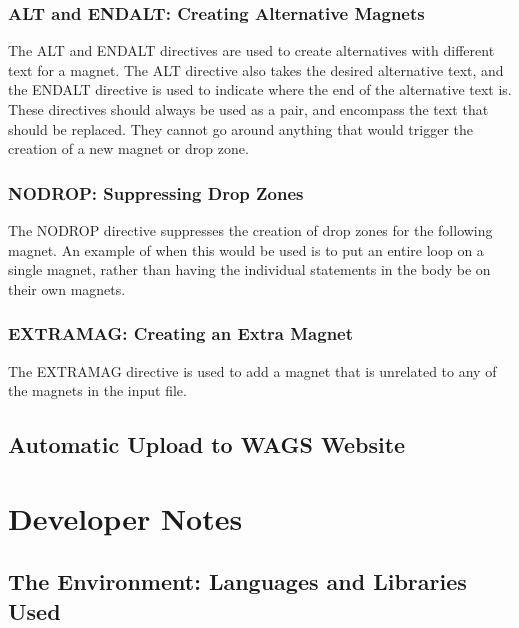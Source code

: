 \documentclass[letter,10pt]{article}
\begin{document}
\subsubsection{ALT and ENDALT: Creating Alternative Magnets}

The ALT and ENDALT directives are used to create alternatives with 
different text for a magnet. The ALT directive also takes the desired 
alternative text, and the ENDALT directive is used to indicate where 
the end of the alternative text is. These directives should always be 
used as a pair, and encompass the text that should be replaced. They 
cannot go around anything that would trigger the creation of a new 
magnet or drop zone.


\subsubsection{NODROP: Suppressing Drop Zones}

The NODROP directive suppresses the creation of drop zones for the 
following magnet. An example of when this would be used is to put an 
entire loop on a single magnet, rather than having the individual 
statements in the body be on their own magnets.


\subsubsection{EXTRAMAG: Creating an Extra Magnet}

The EXTRAMAG directive is used to add a magnet that is unrelated to any 
of the magnets in the input file. 



\subsection{Automatic Upload to WAGS Website}

\section{Developer Notes}

\subsection{The Environment: Languages and Libraries Used}
\end{document}
